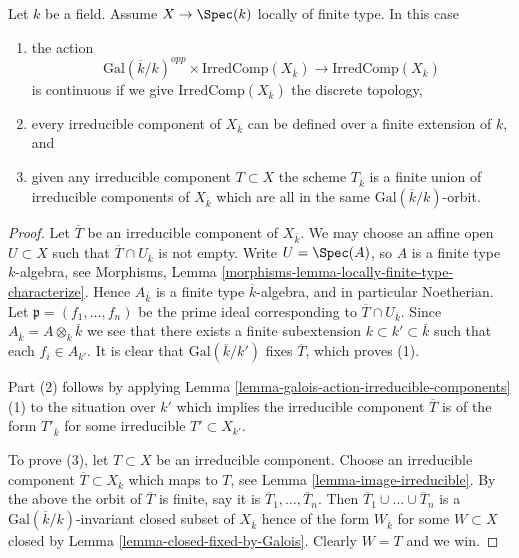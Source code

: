 \begin{lemma}
\label{lemma-galois-action-irreducible-components-locally-finite-type}
Let $k$ be a field.
Assume $X \to \Spec(k)$ locally of finite type.
In this case
\begin{enumerate}
\item the action
$$
\text{Gal}(\overline{k}/k)^{opp} \times \text{IrredComp}(X_{\overline{k}})
\longrightarrow
\text{IrredComp}(X_{\overline{k}})
$$
is continuous if we give $\text{IrredComp}(X_{\overline{k}})$ the discrete
topology,
\item every irreducible component of $X_{\overline{k}}$
can be defined over a finite extension of $k$, and
\item given any irreducible component $T \subset X$ the scheme
$T_{\overline{k}}$ is a finite union of irreducible components of
$X_{\overline{k}}$ which are all in the same
$\text{Gal}(\overline{k}/k)$-orbit.
\end{enumerate}
\end{lemma}

\begin{proof}
Let $\overline{T}$ be an irreducible component of $X_{\overline{k}}$.
We may choose an affine open $U \subset X$ such that
$\overline{T} \cap U_{\overline{k}}$ is not empty.
Write $U = \Spec(A)$, so $A$ is a finite type $k$-algebra, see
Morphisms, Lemma \ref{morphisms-lemma-locally-finite-type-characterize}.
Hence $A_{\overline{k}}$ is a finite type $\overline{k}$-algebra,
and in particular Noetherian. Let $\mathfrak p = (f_1, \ldots, f_n)$
be the prime ideal corresponding to $\overline{T} \cap U_{\overline{k}}$.
Since $A_{\overline{k}} = A \otimes_k \overline{k}$
we see that there exists a finite subextension
$k \subset k' \subset \overline{k}$ such that each $f_i \in A_{k'}$.
It is clear that $\text{Gal}(\overline{k}/k')$
fixes $\overline{T}$, which proves (1).

\medskip\noindent
Part (2) follows by applying
Lemma \ref{lemma-galois-action-irreducible-components} (1)
to the situation over $k'$ which implies the irreducible component
$\overline{T}$ is of the form $T'_{\overline{k}}$ for some irreducible
$T' \subset X_{k'}$.

\medskip\noindent
To prove (3), let $T \subset X$ be an irreducible component.
Choose an irreducible component $\overline{T} \subset X_{\overline{k}}$
which maps to $T$, see
Lemma \ref{lemma-image-irreducible}.
By the above the orbit of $\overline{T}$ is finite, say it is
$\overline{T}_1, \ldots, \overline{T}_n$. Then
$\overline{T}_1 \cup \ldots \cup \overline{T}_n$
is a $\text{Gal}(\overline{k}/k)$-invariant closed subset of $X_{\overline{k}}$
hence of the form $W_{\overline{k}}$ for some $W \subset X$ closed by
Lemma \ref{lemma-closed-fixed-by-Galois}.
Clearly $W = T$ and we win.
\end{proof}

